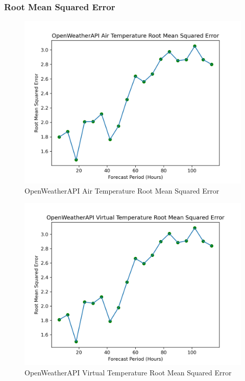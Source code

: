 \begin{appendices}
    \subsubsection{Root Mean Squared Error}
    \begin{figure}[H]
        \centering
        \includegraphics[width=.7\linewidth]{Graphs/accuracy/appendices/openweatherapi/air_temperature/root_mean_squared_error.png}
        \caption{OpenWeatherAPI Air Temperature Root Mean Squared Error}
    \end{figure}
    
    \begin{figure}[H]
        \centering
        \includegraphics[width=.7\linewidth]{Graphs/accuracy/appendices/openweatherapi/virtual_temperature/root_mean_squared_error.png}
        \caption{OpenWeatherAPI Virtual Temperature Root Mean Squared Error}
    \end{figure}
    

\end{appendices}
